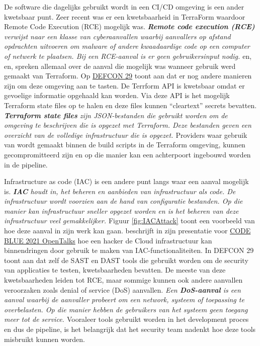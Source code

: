 De software die dagelijks gebruikt wordt in een CI/CD omgeving is een ander kwetsbaar punt. Zeer recent was er een kwetsbaarheid in TerraForm waardoor Remote Code Execution (RCE) mogelijk was. \textit{\textbf{Remote code execution (RCE)} verwijst naar een klasse van cyberaanvallen waarbij aanvallers op afstand opdrachten uitvoeren om malware of andere kwaadaardige code op een computer of netwerk te plaatsen. Bij een RCE-aanval is er geen gebruikersinput nodig. \textcite{Baker2021}} \textcite{Suezawa2021} en, \textcite{Kaskasoli2021} en, \textcite{Frank2021} spreken allemaal over de aanval die mogelijk was wanneer gebruik werd gemaakt van Terraform. Op \href{https://defcon.org/html/defcon-29/dc-29-index.html}{DEFCON 29} toont \textcite{Ahmed2021} aan dat er nog andere manieren zijn om deze omgeving aan te tasten. De Terrform API is kwetsbaar omdat er gevoelige informatie opgehaald kan worden. Via deze API is het mogelijk Terraform state files op te halen en deze files kunnen “cleartext” secrets bevatten. \textit{\textbf{Terraform state files} zijn JSON-bestanden die gebruikt worden om de omgeving te beschrijven die is opgezet met Terraform. Deze bestanden geven een overzicht van de volledige infrastructuur die is opgezet. \autocite{Salecha2023}} Providers waar gebruik van wordt gemaakt binnen de build scripts in de Terraform omgeving, kunnen gecompromitteerd zijn en op die manier kan een achterpoort ingebouwd worden in de pipeline.
\clearpage

Infrastructure as code (IAC) is een andere punt langs waar een aanval mogelijk is. \textit{\textbf{IAC} houdt in, het beheren en aanbieden van infrastructuur als code. De infrastructuur wordt voorzien aan de hand van configuratie bestanden. Op die manier kan infrastructuur sneller opgezet worden en is het beheren van deze infrastructuur veel gemakkelijker. \autocite{Huettermann2012}} Figuur \ref{fig:IACAttack} toont een voorbeeld van hoe deze aanval in zijn werk kan gaan. \textcite{Suezawa} beschrijft in zijn presentatie voor \href{https://codeblue.jp/2021/en/}{CODE BLUE 2021 OpenTalks} hoe een hacker de Cloud infrastructuur kan binnendringen door gebruik te maken van IAC-functionaliteiten. In DEFCON 29 toont \textcite{Bar2021} aan dat zelf de SAST en DAST tools die gebruikt worden om de security van applicaties te testen, kwetsbaarheden bevatten. De meeste van deze kwetsbaarheden leiden tot RCE, maar sommige kunnen ook andere aanvallen veroorzaken zoals denial of service (DoS) aanvallen. \textit{Een \textbf{DoS-aanval} is een aanval waarbij de aanvaller probeert om een network, systeem of toepassing te overbelasten. Op die manier hebben de gebruikers van het systeem geen toegang meer tot de service. \autocite{LenaertsBergmans2023}} Vooraleer tools gebruikt worden in het development proces en dus de pipeline, is het belangrijk dat het security team nadenkt hoe deze tools misbruikt kunnen worden.
\newline

